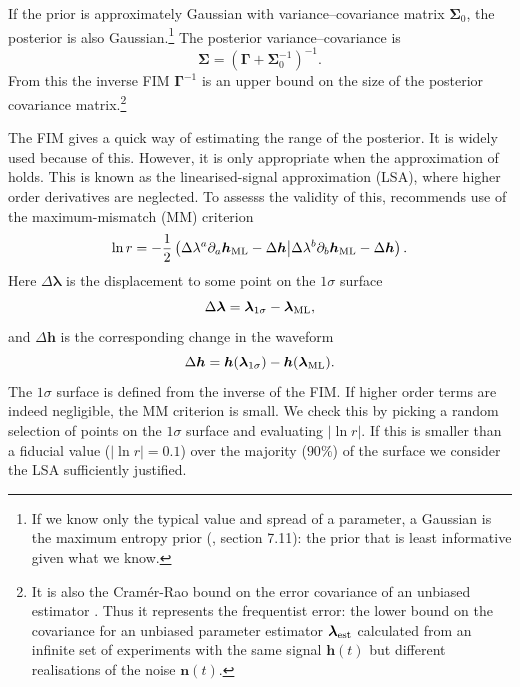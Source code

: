 If the prior is approximately Gaussian with variance--covariance matrix $\boldsymbol{\Sigma}_0$, the posterior is also Gaussian.\footnote{If we know only the typical value and spread of a parameter, a Gaussian is the maximum entropy prior (\citealt{Jaynes2003}, section 7.11): the prior that is least informative given what we know.} The posterior variance--covariance is \citep{Cutler1994, Vallisneri2008}
\begin{equation}
\boldsymbol{\Sigma} = \left(\boldsymbol{\Gamma} + \boldsymbol{\Sigma}_0^{-1}\right)^{-1}.
\label{eq:Posterior_variance}
\end{equation}
From this the inverse FIM $\boldsymbol{\Gamma}^{-1}$ is an upper bound on the size of the posterior covariance matrix.\footnote{It is also the Cram\'{e}r-Rao bound on the error covariance of an unbiased estimator \citep{Cutler1994, Vallisneri2008}. Thus it represents the frequentist error: the lower bound on the covariance for an unbiased parameter estimator $\boldsymbol{\lambda}_\mathrm{est}$ calculated from an infinite set of experiments with the same signal $\boldsymbol{h}(t)$ but different realisations of the noise $\boldsymbol{n}(t)$.}

The FIM gives a quick way of estimating the range of the posterior. It is widely used because of this. However, it is only appropriate when the approximation of  holds. This is known as the linearised-signal approximation (LSA), where higher order derivatives are neglected. To assesss the validity of this, \citet{Vallisneri2008} recommends use of the maximum-mismatch (MM) criterion
\begin{equation}
\ln r = -\dfrac{1}{2}\left({\Delta\lambda^a\partial_a\boldsymbol{h}_\mathrm{ML} - \Delta\boldsymbol{h}}\middle|{\Delta\lambda^b\partial_b\boldsymbol{h}_\mathrm{ML} - \Delta\boldsymbol{h}}\right).
\end{equation}
Here $\Delta \boldsymbol{\lambda}$ is the displacement to some point on the $1\sigma$ surface
\begin{equation}
\Delta \boldsymbol{\lambda} = \boldsymbol{\lambda}_\mathrm{1\sigma} - \boldsymbol{\lambda}_\mathrm{ML},
\end{equation}
and $\Delta \boldsymbol{h}$ is the corresponding change in the waveform
\begin{equation}
\Delta \boldsymbol{h} = \boldsymbol{h}(\boldsymbol{\lambda}_\mathrm{1\sigma}) - \boldsymbol{h}(\boldsymbol{\lambda}_\mathrm{ML}).
\end{equation}
The $1\sigma$ surface is defined from the inverse of the FIM. If higher order terms are indeed negligible, the MM criterion is small. We check this by picking a random selection of points on the $1\sigma$ surface and evaluating $|\ln r|$. If this is smaller than a fiducial value ($|\ln r| = 0.1$) over the majority ($90\%$) of the surface we consider the LSA sufficiently justified.

